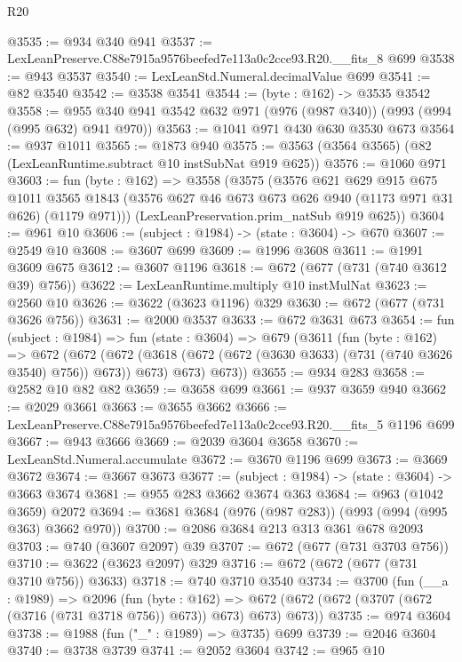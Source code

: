 \begin{lexlean}{R20}
\begin{coremodule}
@3535 := @934 @340 @941
@3537 := LexLeanPreserve.C88e7915a9576beefed7e113a0c2cce93.R20.__fits_8 @699
@3538 := @943 @3537
@3540 := LexLeanStd.Numeral.decimalValue @699
@3541 := @82 @3540
@3542 := @3538 @3541
@3544 := (byte : @162) -> @3535 @3542
@3558 := @955 @340 @941 @3542 @632 @971 (@976 (@987 @340)) (@993 (@994 (@995 @632) @941 @970))
@3563 := @1041 @971 @430 @630 @3530 @673
@3564 := @937 @1011
@3565 := @1873 @940
@3575 := @3563 (@3564 @3565) (@82 (LexLeanRuntime.subtract @10 instSubNat @919 @625))
@3576 := @1060 @971
@3603 := fun (byte : @162) =>
  @3558
    (@3575
      (@3576
        @621
        @629
        @915
        @675
        @1011
        @3565
        @1843
        (@3576 @627 @46 @673 @673 @626 @940 (@1173 @971 @31 @626) (@1179 @971)))
      (LexLeanPreservation.prim_natSub @919 @625))
@3604 := @961 @10
@3606 := (subject : @1984) -> (state : @3604) -> @670
@3607 := @2549 @10
@3608 := @3607 @699
@3609 := @1996 @3608
@3611 := @1991 @3609 @675
@3612 := @3607 @1196
@3618 := @672 (@677 (@731 (@740 @3612 @39) @756))
@3622 := LexLeanRuntime.multiply @10 instMulNat
@3623 := @2560 @10
@3626 := @3622 (@3623 @1196) @329
@3630 := @672 (@677 (@731 @3626 @756))
@3631 := @2000 @3537
@3633 := @672 @3631 @673
@3654 := fun (subject : @1984) =>
  fun (state : @3604) =>
  @679
    (@3611
      (fun (byte : @162) =>
      @672
        (@672
          (@672 (@3618 (@672 (@672 (@3630 @3633) (@731 (@740 @3626 @3540) @756)) @673)) @673)
          @673)
        @673))
@3655 := @934 @283
@3658 := @2582 @10 @82 @82
@3659 := @3658 @699
@3661 := @937 @3659 @940
@3662 := @2029 @3661
@3663 := @3655 @3662
@3666 := LexLeanPreserve.C88e7915a9576beefed7e113a0c2cce93.R20.__fits_5 @1196 @699
@3667 := @943 @3666
@3669 := @2039 @3604 @3658
@3670 := LexLeanStd.Numeral.accumulate
@3672 := @3670 @1196 @699
@3673 := @3669 @3672
@3674 := @3667 @3673
@3677 := (subject : @1984) -> (state : @3604) -> @3663 @3674
@3681 := @955 @283 @3662 @3674 @363
@3684 := @963 (@1042 @3659) @2072
@3694 := @3681 @3684 (@976 (@987 @283)) (@993 (@994 (@995 @363) @3662 @970))
@3700 := @2086 @3684 @213 @313 @361 @678 @2093
@3703 := @740 (@3607 @2097) @39
@3707 := @672 (@677 (@731 @3703 @756))
@3710 := @3622 (@3623 @2097) @329
@3716 := @672 (@672 (@677 (@731 @3710 @756)) @3633)
@3718 := @740 @3710 @3540
@3734 := @3700
    (fun (__a : @1989) =>
    @2096
      (fun (byte : @162) =>
      @672 (@672 (@672 (@3707 (@672 (@3716 (@731 @3718 @756)) @673)) @673) @673) @673))
@3735 := @974 @3604
@3738 := @1988 (fun ("_" : @1989) => @3735) @699
@3739 := @2046 @3604
@3740 := @3738 @3739
@3741 := @2052 @3604
@3742 := @965 @10

\end{coremodule}
\end{lexlean}
